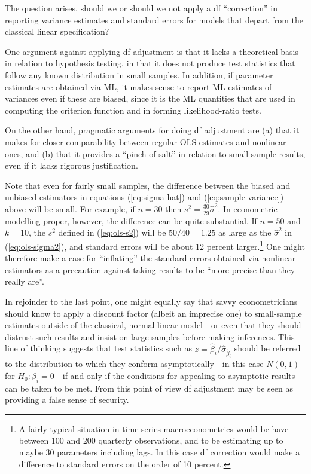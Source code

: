 The question arises, should we or should we not apply a df
``correction'' in reporting variance estimates and standard errors
for models that depart from the classical linear specification?

One argument against applying df adjustment is that it lacks a
theoretical basis in relation to hypothesis testing, in that it does
not produce test statistics that follow any known distribution in
small samples.  In addition, if parameter estimates are obtained via
ML, it makes sense to report ML estimates of variances even if these
are biased, since it is the ML quantities that are used in computing
the criterion function and in forming likelihood-ratio tests.

On the other hand, pragmatic arguments for doing df adjustment are (a)
that it makes for closer comparability between regular OLS estimates
and nonlinear ones, and (b) that it provides a ``pinch of salt'' in
relation to small-sample results, even if it lacks rigorous
justification.  

Note that even for fairly small samples, the difference between the
biased and unbiased estimators in equations (\ref{eq:sigma-hat}) and
(\ref{eq:sample-variance}) above will be small.  For example, if
$n=30$ then $s^2 = \frac{30}{29} \hat\sigma^2$.  In econometric
modelling proper, however, the difference can be quite substantial.
If $n=50$ and $k=10$, the $s^2$ defined in (\ref{eq:ols-s2}) will be
$50/40 = 1.25$ as large as the $\hat\sigma^2$ in
(\ref{eq:ols-sigma2}), and standard errors will be about 12 percent
larger.\footnote{A fairly typical situation in time-series
  macroeconometrics would be have between 100 and 200 quarterly
  observations, and to be estimating up to maybe 30 parameters
  including lags.  In this case df correction would make a difference
  to standard errors on the order of 10 percent.}  One might therefore
make a case for ``inflating'' the standard errors obtained via
nonlinear estimators as a precaution against taking results to be
``more precise than they really are''.

In rejoinder to the last point, one might equally say that savvy
econometricians should know to apply a discount factor (albeit an
imprecise one) to small-sample estimates outside of the classical,
normal linear model---or even that they should distrust such results
and insist on large samples before making inferences. This line of
thinking suggests that test statistics such as $z =
\hat{\beta}_i/\hat\sigma_{\hat{\beta}_i}$ should be referred to the
distribution to which they conform asymptotically---in this case
$N(0,1)$ for $H_0: \beta_i = 0$---if and only if the conditions for
appealing to asymptotic results can be taken to be met.  From this
point of view df adjustment may be seen as providing a false sense of
security.  


